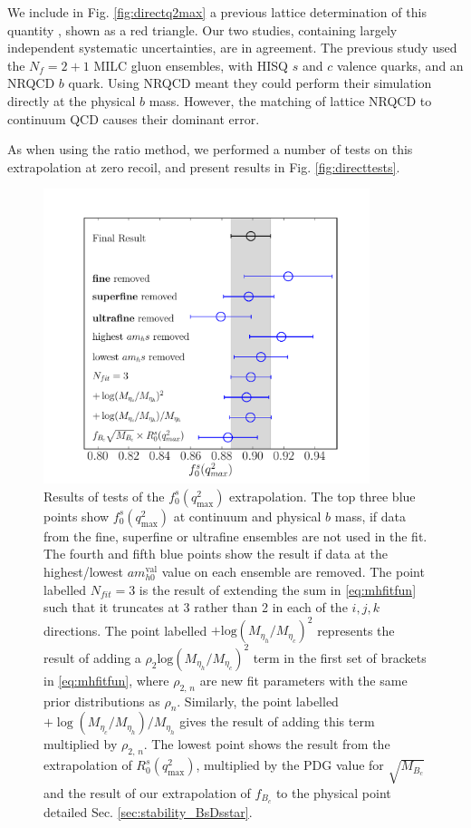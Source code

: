 We include in Fig. \ref{fig:directq2max} a previous lattice determination of this quantity \cite{Monahan:2017uby}, shown as a red triangle. Our two studies, containing largely independent systematic uncertainties, are in agreement. The previous study used the $N_f=2+1$ MILC gluon ensembles, with HISQ $s$ and $c$ valence quarks, and an NRQCD $b$ quark. Using NRQCD meant they could perform their simulation directly at the physical $b$ mass. However, the matching of lattice NRQCD to continuum QCD causes their dominant error.

As when using the ratio method, we performed a number of tests on this extrapolation at zero recoil, and present results in Fig. \ref{fig:directtests}.

\begin{figure}[ht]
  \begin{center}
  \hspace{-20pt}
  \includegraphics[width=0.85\textwidth]{images/BsDs/direct/f0q2max_stability.pdf}
  \caption{ Results of tests of the $f_0^s(q^2_{\text{max}})$ extrapolation. The top three blue points show $f_0^s(q^2_{\text{max}})$ at continuum and physical $b$ mass, if data from the fine, superfine or ultrafine ensembles are not used in the fit. The fourth and fifth blue points show the result if data at the highest/lowest $am_{h0}^{\text{val}}$ value on each ensemble are removed. The point labelled $N_{fit}=3$ is the result of extending the sum in \eqref{eq:mhfitfun} such that it truncates at 3 rather than 2 in each of the $i,j,k$ directions. The point labelled $+\text{log}(M_{\eta_h}/M_{\eta_c})^2$ represents the result of adding a $\rho_{2} \text{log}(M_{\eta_h}/M_{\eta_c})^2$ term in the first set of brackets in \eqref{eq:mhfitfun}, where $\rho_{2,\,n}$ are new fit parameters with the same prior distributions as $\rho_{n}$. Similarly, the point labelled $+\log(M_{\eta_c}/M_{\eta_h})/M_{\eta_h}$ gives the result of adding this term multiplied by $\rho_{2,\,n}$. The lowest point shows the result from the extrapolation of $R_0^s(q^2_{\text{max}})$, multiplied by the PDG value for $\sqrt{M_{B_c}}$ \cite{PhysRevD.98.030001} and the result of our extrapolation of $f_{B_c}$ to the physical point detailed Sec. \ref{sec:stability_BsDsstar}.
}
\end{center}
\end{figure}
